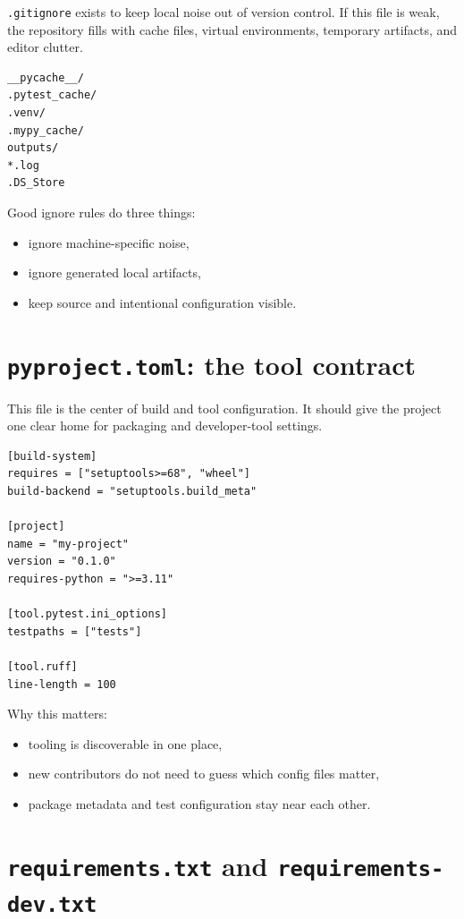 \documentclass[11pt,oneside]{book}
\begin{document}
\texttt{.gitignore} exists to keep local noise out of version control.  
If this file is weak, the repository fills with cache files, virtual environments, temporary artifacts, and editor clutter.

\begin{lstlisting}[style=bookcode]
__pycache__/
.pytest_cache/
.venv/
.mypy_cache/
outputs/
*.log
.DS_Store
\end{lstlisting}

Good ignore rules do three things:
\begin{itemize}
  \item ignore machine-specific noise,
  \item ignore generated local artifacts,
  \item keep source and intentional configuration visible.
\end{itemize}

\section*{\texttt{pyproject.toml}: the tool contract}

This file is the center of build and tool configuration.  
It should give the project one clear home for packaging and developer-tool settings.

\begin{lstlisting}[style=bookcode]
[build-system]
requires = ["setuptools>=68", "wheel"]
build-backend = "setuptools.build_meta"

[project]
name = "my-project"
version = "0.1.0"
requires-python = ">=3.11"

[tool.pytest.ini_options]
testpaths = ["tests"]

[tool.ruff]
line-length = 100
\end{lstlisting}

Why this matters:
\begin{itemize}
  \item tooling is discoverable in one place,
  \item new contributors do not need to guess which config files matter,
  \item package metadata and test configuration stay near each other.
\end{itemize}

\section*{\texttt{requirements.txt} and \texttt{requirements-dev.txt}}
\end{document}
